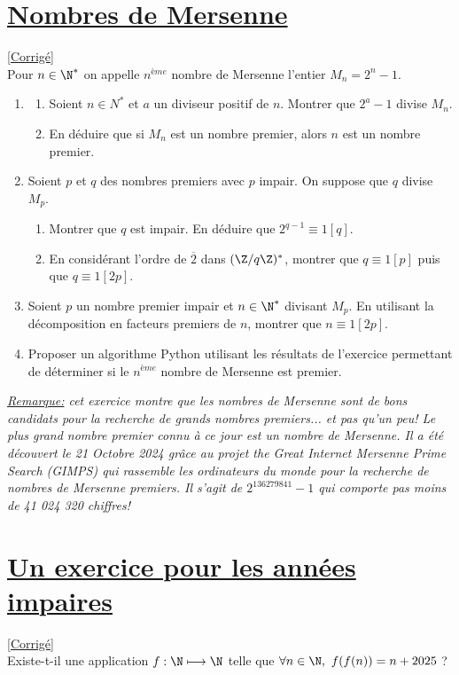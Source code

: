 \documentclass[8pt]{book}
\begin{document}
\section{\underline{Nombres de Mersenne} }
\label{Nombres de Mersenne}
\textcolor{blue}{\hyperref[Nombres de Mersenne corrigé]{[Corrigé]}}\\
Pour $n\in \N^*$ on appelle $n^{ème}$ nombre de Mersenne l'entier $M_n=2^n-1$.
\begin{enumerate}[leftmargin=*]
	\item \begin{enumerate}[label=\alph*.]
		\item Soient $n\in N^*$ et $a$ un diviseur positif de $n$. Montrer que $2^a-1$ divise $M_n$.
		\item En déduire que si $M_n$ est un nombre premier, alors $n$ est un nombre premier.
	\end{enumerate}
	\item Soient $p$ et $q$ des nombres premiers avec $p$ impair. On suppose que $q$ divise $M_p$.
	\begin{enumerate}[label=\alph*.]
		\item Montrer que $q$ est impair. En déduire que $2^{q-1}\equiv 1 [q]$.
		\item En considérant l'ordre de $\overline{2}$ dans $(\Z/q\Z)^*$, montrer que $q\equiv 1[p]$ puis que $q\equiv 1[2p]$.
	\end{enumerate}
	\item Soient $p$ un nombre premier impair et $n\in \N^*$ divisant $M_p$. En utilisant la décomposition en facteurs premiers de $n$, montrer que $n\equiv 1[2p]$.
	\item Proposer un algorithme Python utilisant les résultats de l'exercice permettant de déterminer si le $n^{ème}$ nombre de Mersenne est premier.
\end{enumerate}
\textit{\underline{Remarque:} cet exercice montre que les nombres de Mersenne sont de bons candidats pour la recherche de grands nombres premiers... et pas qu'un peu! Le plus grand nombre premier connu à ce jour est un nombre de Mersenne. Il a été découvert le 21 Octobre 2024 grâce au projet the Great Internet Mersenne Prime Search (GIMPS) qui rassemble les ordinateurs du monde pour la recherche de nombres de Mersenne premiers. Il s'agit de $2^{136279841}-1$ qui comporte pas moins de 41 024 320 chiffres!}

\section{\underline{Un exercice pour les années impaires} }
\label{Un exercice pour les années impaires}
\textcolor{blue}{\hyperref[Un exercice pour les années impaires corrigé]{[Corrigé]}}\\
Existe-t-il une application $f:\N \longmapsto \N$ telle que $\forall n\in \N,\ f(f(n))=n+2025$ ?
\end{document}
